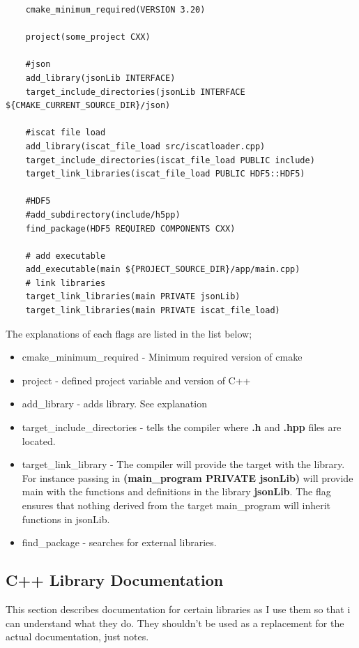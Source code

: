 \begin{verbatim}
    cmake_minimum_required(VERSION 3.20)

    project(some_project CXX)
    
    #json
    add_library(jsonLib INTERFACE)
    target_include_directories(jsonLib INTERFACE ${CMAKE_CURRENT_SOURCE_DIR}/json)

    #iscat file load
    add_library(iscat_file_load src/iscatloader.cpp)
    target_include_directories(iscat_file_load PUBLIC include)
    target_link_libraries(iscat_file_load PUBLIC HDF5::HDF5)

    #HDF5
    #add_subdirectory(include/h5pp)
    find_package(HDF5 REQUIRED COMPONENTS CXX)

    # add executable
    add_executable(main ${PROJECT_SOURCE_DIR}/app/main.cpp)
    # link libraries
    target_link_libraries(main PRIVATE jsonLib)
    target_link_libraries(main PRIVATE iscat_file_load)
\end{verbatim}
The explanations of each flags are listed in the list below;
\begin{itemize}
    \item cmake\_minimum\_required - Minimum required version of cmake
    \item project - defined project variable and version of C++
    \item add\_library - adds library. See explanation
    \item target\_include\_directories - tells the compiler where \textbf{.h} and \textbf{.hpp} files are located.
    \item target\_link\_library - The compiler will provide the target with the library. For instance passing in \textbf{(main\_program PRIVATE jsonLib)} will provide main with the functions and definitions in the library \textbf{jsonLib}. The flag ensures that nothing derived from the target main\_program will inherit functions in jsonLib. 
    \item find\_package - searches for external libraries. 
\end{itemize}

\subsection{C++ Library Documentation}

This section describes documentation for certain libraries as I use them so that i can understand what they do. They shouldn't be used as a replacement for the actual documentation, just notes.

